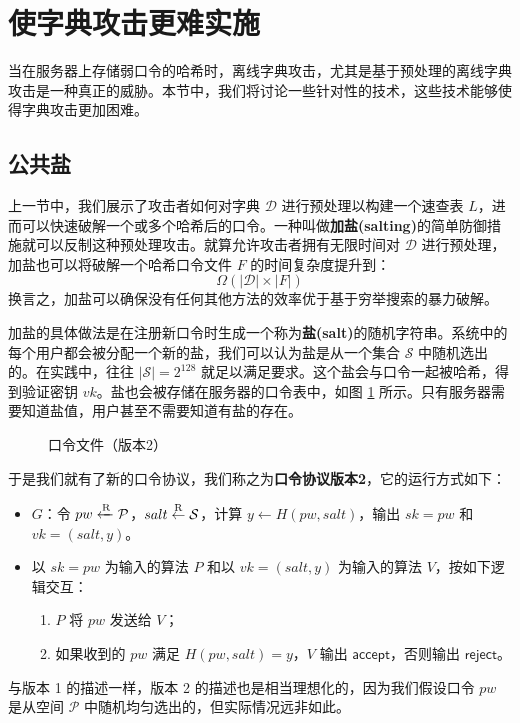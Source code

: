 \section{使字典攻击更难实施}

当在服务器上存储弱口令的哈希时，离线字典攻击，尤其是基于预处理的离线字典攻击是一种真正的威胁。本节中，我们将讨论一些针对性的技术，这些技术能够使得字典攻击更加困难。

\subsection{公共盐}

上一节中，我们展示了攻击者如何对字典 $\mathcal{D}$ 进行预处理以构建一个速查表 $L$，进而可以快速破解一个或多个哈希后的口令。一种叫做\textbf{加盐(salting)}的简单防御措施就可以反制这种预处理攻击。就算允许攻击者拥有无限时间对 $\mathcal{D}$ 进行预处理，加盐也可以将破解一个哈希口令文件 $F$ 的时间复杂度提升到：
\[
\Omega(|\mathcal{D}|\times |F|)
\]
换言之，加盐可以确保没有任何其他方法的效率优于基于穷举搜索的暴力破解。

加盐的具体做法是在注册新口令时生成一个称为\textbf{盐(salt)}的随机字符串。系统中的每个用户都会被分配一个新的盐，我们可以认为盐是从一个集合 $\mathcal{S}$ 中随机选出的。在实践中，往往 $|\mathcal{S}|=2^{128}$ 就足以满足要求。这个盐会与口令一起被哈希，得到验证密钥 $vk$。盐也会被存储在服务器的口令表中，如图 \ref{fig:18-4} 所示。只有服务器需要知道盐值，用户甚至不需要知道有盐的存在。

\begin{figure}
  \centering
  
  \caption{口令文件（版本2）}
  \label{fig:18-4}
\end{figure}

于是我们就有了新的口令协议，我们称之为\textbf{口令协议版本2}，它的运行方式如下：
\begin{itemize}
	\item $G$：令 $pw \xleftarrow{\rm R}\mathcal{P}$，$salt\overset{\rm R}\leftarrow\mathcal{S}$，计算 $y\leftarrow H(pw,salt)$，输出 $sk=pw$ 和 $vk=(salt,y)$。
	\item 以 $sk=pw$ 为输入的算法 $P$ 和以 $vk=(salt,y)$ 为输入的算法 $V$，按如下逻辑交互：
	\begin{enumerate}
		\item $P$ 将 $pw$ 发送给 $V$；
		\item 如果收到的 $pw$ 满足 $H(pw,salt)=y$，$V$ 输出 $\mathsf{accept}$，否则输出 $\mathsf{reject}$。
	\end{enumerate}
\end{itemize}
与版本 1 的描述一样，版本 2 的描述也是相当理想化的，因为我们假设口令 $pw$ 是从空间 $\mathcal{P}$ 中随机均匀选出的，但实际情况远非如此。

